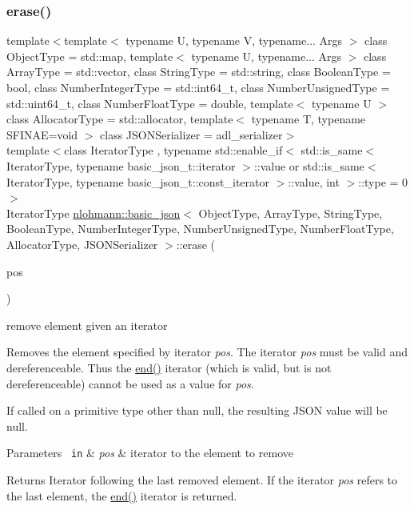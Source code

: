\subsubsection{\texorpdfstring{erase()}{erase()}\hspace{0.1cm}{\footnotesize\ttfamily [1/4]}}
{\footnotesize\ttfamily template$<$template$<$ typename U, typename V, typename... Args $>$ class Object\+Type = std\+::map, template$<$ typename U, typename... Args $>$ class Array\+Type = std\+::vector, class String\+Type  = std\+::string, class Boolean\+Type  = bool, class Number\+Integer\+Type  = std\+::int64\+\_\+t, class Number\+Unsigned\+Type  = std\+::uint64\+\_\+t, class Number\+Float\+Type  = double, template$<$ typename U $>$ class Allocator\+Type = std\+::allocator, template$<$ typename T, typename S\+F\+I\+N\+A\+E=void $>$ class J\+S\+O\+N\+Serializer = adl\+\_\+serializer$>$ \\
template$<$class Iterator\+Type , typename std\+::enable\+\_\+if$<$ std\+::is\+\_\+same$<$ Iterator\+Type, typename basic\+\_\+json\+\_\+t\+::iterator $>$\+::value or std\+::is\+\_\+same$<$ Iterator\+Type, typename basic\+\_\+json\+\_\+t\+::const\+\_\+iterator $>$\+::value, int $>$\+::type  = 0$>$ \\
Iterator\+Type \mbox{\hyperlink{classnlohmann_1_1basic__json}{nlohmann\+::basic\+\_\+json}}$<$ Object\+Type, Array\+Type, String\+Type, Boolean\+Type, Number\+Integer\+Type, Number\+Unsigned\+Type, Number\+Float\+Type, Allocator\+Type, J\+S\+O\+N\+Serializer $>$\+::erase (\begin{DoxyParamCaption}\item[{Iterator\+Type}]{pos }\end{DoxyParamCaption})\hspace{0.3cm}{\ttfamily [inline]}}



remove element given an iterator 

Removes the element specified by iterator {\itshape pos}. The iterator {\itshape pos} must be valid and dereferenceable. Thus the {\ttfamily \mbox{\hyperlink{classnlohmann_1_1basic__json_a13e032a02a7fd8a93fdddc2fcbc4763c}{end()}}} iterator (which is valid, but is not dereferenceable) cannot be used as a value for {\itshape pos}.

If called on a primitive type other than {\ttfamily null}, the resulting J\+S\+ON value will be {\ttfamily null}.


\begin{DoxyParams}[1]{Parameters}
\mbox{\texttt{ in}}  & {\em pos} & iterator to the element to remove \\
\hline
\end{DoxyParams}
\begin{DoxyReturn}{Returns}
Iterator following the last removed element. If the iterator {\itshape pos} refers to the last element, the {\ttfamily \mbox{\hyperlink{classnlohmann_1_1basic__json_a13e032a02a7fd8a93fdddc2fcbc4763c}{end()}}} iterator is returned.
\end{DoxyReturn}

